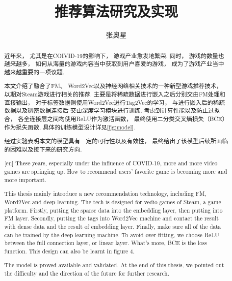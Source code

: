\documentclass{hainanuthesis}
\title{推荐算法研究及实现}
\author{张奥星}
\begin{document}
\makecover{}

\begin{abstract}
    近年来，
    尤其是在COIVID-19的影响下，
    游戏产业愈发地繁荣.
    同时，
    游戏的数量也越来越多，
    如何从海量的游戏内容当中获取到用户喜爱的游戏，
    成为了游戏产业当中越来越重要的一项议题.

    本文介绍了融合了FM、
    Word2Vec以及神经网络相关技术的一种新型游戏推荐技术，
    以期对Steam游戏进行相关的推荐.
    主要是将稀疏数据进行嵌入之后分别交由FM处理和直接输出，
    对于标签数据则使用Word2Vec进行Tag2Vec的学习，
    与进行嵌入后的稀疏数据以及稠密数据连接后
    交由深度学习模块进行训练.
    考虑到计算性能以及防止过拟合，
    各全连接层之间均使用ReLU作为激活函数，
    最终使用二分类交叉熵损失（BCE）作为损失函数.
    具体的训练模型设计详见\cref{fig:model}.

    经过实验表明本文的模型具有一定的可行性以及有效性，
    最终给出了该模型后续所面临的困难以及接下来的研究方向.
\end{abstract}

\newpage

\begin{abstract}[en]
    These years,
    especially under the influence of COVID-19,
    more and more video games are springing up.
    How to recommend users' favorite game is becoming
    more and more important.

    This thesis mainly introduce a new recommendation technology,
    including FM, Word2Vec and deep learning.
    The tech is designed for vedio games of Steam,
    a game platform.
    Firstly,
    putting the sparse data into the embedding layer,
    then putting into FM layer.
    Secondly,
    putting the tags into Word2Vec machine and
    contact the result with dense data and
    the result of embedding layer.
    Finally,
    make sure all of the data can be trained by
    the deep learning machine.
    To avoid over-fitting,
    we choose ReLU between the full connection layer,
    or linear layer.
    What's more,
    BCE is the loss function.
    This design can also be learnt in figure 4.

    The model is proved available and validated.
    At the end of this thesis,
    we pointed out the difficulty and
    the direction of the future for further research.
\end{abstract}
\end{document}
